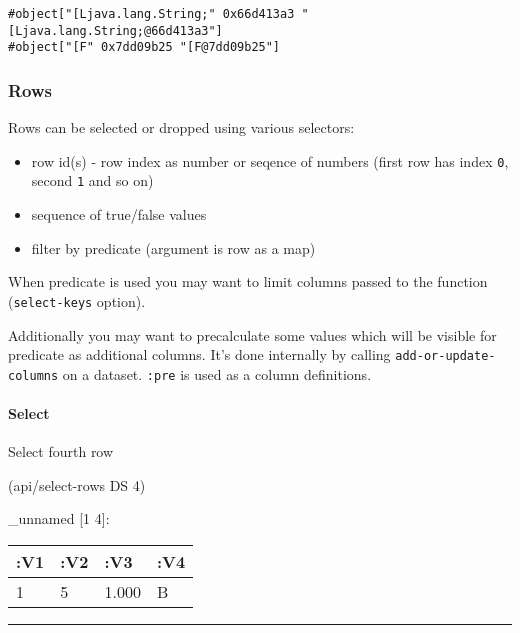 \documentclass[]{article}
\newenvironment{Shaded}{\begin{snugshade}}{\end{snugshade}}
\newcommand{\DecValTok}[1]{\textcolor[rgb]{0.00,0.00,0.81}{#1}}
\newcommand{\NormalTok}[1]{#1}
\providecommand{\tightlist}{%
  \setlength{\itemsep}{0pt}\setlength{\parskip}{0pt}}
\let\oldparagraph\paragraph
\renewcommand{\paragraph}[1]{\oldparagraph{#1}\mbox{}}
\begin{document}
\begin{verbatim}
#object["[Ljava.lang.String;" 0x66d413a3 "[Ljava.lang.String;@66d413a3"]
#object["[F" 0x7dd09b25 "[F@7dd09b25"]
\end{verbatim}

\subsubsection{Rows}\label{rows}

Rows can be selected or dropped using various selectors:

\begin{itemize}
\tightlist
\item
  row id(s) - row index as number or seqence of numbers (first row has
  index \texttt{0}, second \texttt{1} and so on)
\item
  sequence of true/false values
\item
  filter by predicate (argument is row as a map)
\end{itemize}

When predicate is used you may want to limit columns passed to the
function (\texttt{select-keys} option).

Additionally you may want to precalculate some values which will be
visible for predicate as additional columns. It's done internally by
calling \texttt{add-or-update-columns} on a dataset. \texttt{:pre} is
used as a column definitions.

\paragraph{Select}\label{select-1}

Select fourth row

\begin{Shaded}
\begin{Highlighting}[]
\NormalTok{(api/select-rows DS }\DecValTok{4}\NormalTok{)}
\end{Highlighting}
\end{Shaded}

\_unnamed {[}1 4{]}:

\begin{longtable}[]{@{}llll@{}}
\toprule
:V1 & :V2 & :V3 & :V4\tabularnewline
\midrule
\endhead
1 & 5 & 1.000 & B\tabularnewline
\bottomrule
\end{longtable}

\begin{center}\rule{0.5\linewidth}{0.5pt}\end{center}
\end{document}
